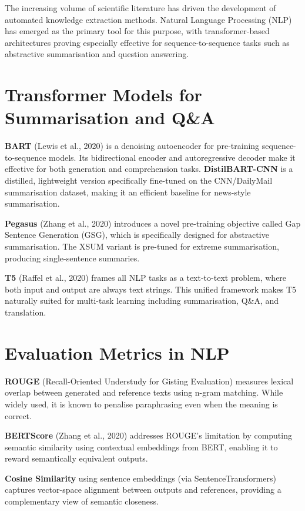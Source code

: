 \documentclass[12pt, a4paper]{report}
\begin{document}
The increasing volume of scientific literature has driven the development of automated knowledge extraction methods. Natural Language Processing (NLP) has emerged as the primary tool for this purpose, with transformer-based architectures proving especially effective for sequence-to-sequence tasks such as abstractive summarisation and question answering.

\section{Transformer Models for Summarisation and Q\&A}

\textbf{BART} (Lewis et al., 2020) is a denoising autoencoder for pre-training sequence-to-sequence models. Its bidirectional encoder and autoregressive decoder make it effective for both generation and comprehension tasks. \textbf{DistilBART-CNN} is a distilled, lightweight version specifically fine-tuned on the CNN/DailyMail summarisation dataset, making it an efficient baseline for news-style summarisation.

\textbf{Pegasus} (Zhang et al., 2020) introduces a novel pre-training objective called Gap Sentence Generation (GSG), which is specifically designed for abstractive summarisation. The XSUM variant is pre-tuned for extreme summarisation, producing single-sentence summaries.

\textbf{T5} (Raffel et al., 2020) frames all NLP tasks as a text-to-text problem, where both input and output are always text strings. This unified framework makes T5 naturally suited for multi-task learning including summarisation, Q\&A, and translation.

\section{Evaluation Metrics in NLP}

\textbf{ROUGE} (Recall-Oriented Understudy for Gisting Evaluation) measures lexical overlap between generated and reference texts using n-gram matching. While widely used, it is known to penalise paraphrasing even when the meaning is correct.

\textbf{BERTScore} (Zhang et al., 2020) addresses ROUGE's limitation by computing semantic similarity using contextual embeddings from BERT, enabling it to reward semantically equivalent outputs.

\textbf{Cosine Similarity} using sentence embeddings (via SentenceTransformers) captures vector-space alignment between outputs and references, providing a complementary view of semantic closeness.
\end{document}
